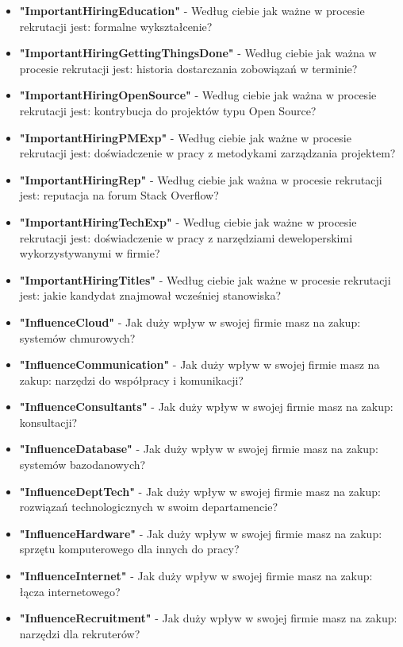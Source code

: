\begin{appendices}
\begin{itemize}
        \item \textbf{"ImportantHiringEducation"} - Według ciebie jak ważne w procesie rekrutacji jest: formalne wykształcenie?
        \item \textbf{"ImportantHiringGettingThingsDone"} - Według ciebie jak ważna w procesie rekrutacji jest: historia dostarczania zobowiązań w terminie?
        \item \textbf{"ImportantHiringOpenSource"} - Według ciebie jak ważna w procesie rekrutacji jest: kontrybucja do projektów typu Open Source?
        \item \textbf{"ImportantHiringPMExp"} - Według ciebie jak ważne w procesie rekrutacji jest: doświadczenie w pracy z metodykami zarządzania projektem?
        \item \textbf{"ImportantHiringRep"} - Według ciebie jak ważna w procesie rekrutacji jest: reputacja na forum Stack Overflow?
        \item \textbf{"ImportantHiringTechExp"} - Według ciebie jak ważne w procesie rekrutacji jest: doświadczenie w pracy z narzędziami deweloperskimi wykorzystywanymi w firmie?
        \item \textbf{"ImportantHiringTitles"} - Według ciebie jak ważne w procesie rekrutacji jest: jakie kandydat znajmował wcześniej stanowiska?
        \item \textbf{"InfluenceCloud"} - Jak duży wpływ w swojej firmie masz na zakup: systemów chmurowych?
        \item \textbf{"InfluenceCommunication"} - Jak duży wpływ w swojej firmie masz na zakup: narzędzi do współpracy i komunikacji?
        \item \textbf{"InfluenceConsultants"} - Jak duży wpływ w swojej firmie masz na zakup: konsultacji?
        \item \textbf{"InfluenceDatabase"} - Jak duży wpływ w swojej firmie masz na zakup: systemów bazodanowych?
        \item \textbf{"InfluenceDeptTech"} - Jak duży wpływ w swojej firmie masz na zakup: rozwiązań technologicznych w swoim departamencie?
        \item \textbf{"InfluenceHardware"} - Jak duży wpływ w swojej firmie masz na zakup: sprzętu komputerowego dla innych do pracy?
        \item \textbf{"InfluenceInternet"} - Jak duży wpływ w swojej firmie masz na zakup: łącza internetowego?
        \item \textbf{"InfluenceRecruitment"} - Jak duży wpływ w swojej firmie masz na zakup: narzędzi dla rekruterów?

\end{itemize}
\end{appendices}
